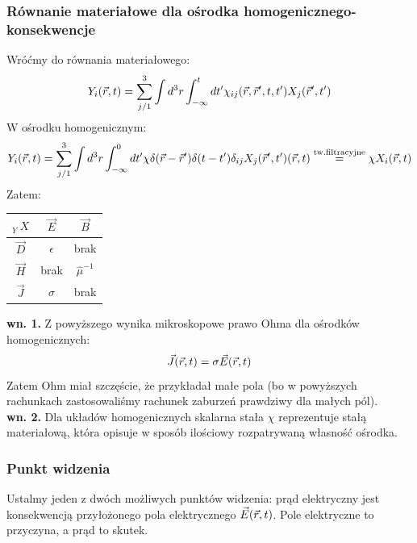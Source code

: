 \subsubsection{Równanie materiałowe dla ośrodka homogenicznego- konsekwencje}
Wróćmy do równania materiałowego:
\begin{equation} {Y}_i(\vec{r},t)=\sum_{j/1}^3 \int d^3r \int_{-\infty}^t dt' {\chi}_{ij}(\vec{r},\vec{r}',t,t') X_j(\vec{r}',t') \end{equation}
W ośrodku homogenicznym:
\begin{equation} {Y}_i(\vec{r},t)=\sum_{j/1}^3 \int d^3r \int_{-\infty}^0 dt' {\chi}\delta(\vec{r}-\vec{r}')\delta(t-t')\delta_{ij} X_j(\vec{r}',t')(\vec{r},t) 
\stackrel{\text{tw.filtracyjne}}{=}\chi X_i(\vec{r},t) \end{equation}
Zatem:\\
\begin{center}
\begin{tabular}{|c||c|c|}
  \hline
 ${_Y^~~X}$ & $\vec{E}$ & $\vec{B}$\\
  \hline\hline
  $\vec{D}$ &  $\hat{\epsilon}$ & brak \\
\hline
  $\vec{H}$ &  brak & $\hat{\mu}^{-1}$ \\
  \hline
  $\vec{J}$ &  $\hat{\sigma}$ &  brak\\
    \hline
\end{tabular} 
\end{center}
\textbf{wn. 1.} Z powyższego wynika mikroskopowe prawo Ohma dla ośrodków homogenicznych: \begin{equation} \vec{J}(\vec{r},t)=\sigma\vec{E}(\vec{r},t) \end{equation}
Zatem Ohm miał szczęście, że przykładał małe pola (bo w powyższych rachunkach zastosowaliśmy rachunek zaburzeń prawdziwy dla małych pól).\\
\textbf{wn. 2.} Dla układów homogenicznych skalarna stała $\chi$ reprezentuje stałą materiałową, która opisuje w sposób ilościowy rozpatrywaną własność ośrodka.
\subsubsection{Punkt widzenia}
Ustalmy jeden z dwóch możliwych punktów widzenia:
prąd elektryczny jest konsekwencją przyłożonego pola elektrycznego $\vec{E}(\vec{r},t)$. Pole elektryczne to przyczyna, a prąd to skutek.
